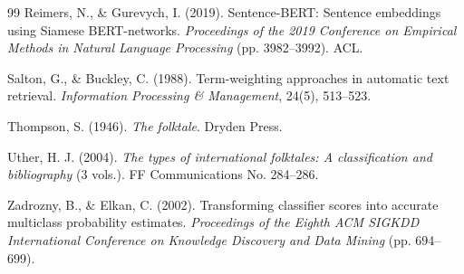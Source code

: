 \documentclass{article}
\begin{document}
{\begin{thebibliography}{99}
Reimers, N., \& Gurevych, I. (2019). Sentence-BERT: Sentence embeddings using Siamese BERT-networks. \textit{Proceedings of the 2019 Conference on Empirical Methods in Natural Language Processing} (pp. 3982--3992). ACL.

Salton, G., \& Buckley, C. (1988). Term-weighting approaches in automatic text retrieval. \textit{Information Processing \& Management}, 24(5), 513--523.

Thompson, S. (1946). \textit{The folktale}. Dryden Press.

Uther, H. J. (2004). \textit{The types of international folktales: A classification and bibliography} (3 vols.). FF Communications No. 284--286.

Zadrozny, B., \& Elkan, C. (2002). Transforming classifier scores into accurate multiclass probability estimates. \textit{Proceedings of the Eighth ACM SIGKDD International Conference on Knowledge Discovery and Data Mining} (pp. 694--699).

\end{thebibliography}

}
\end{document}
